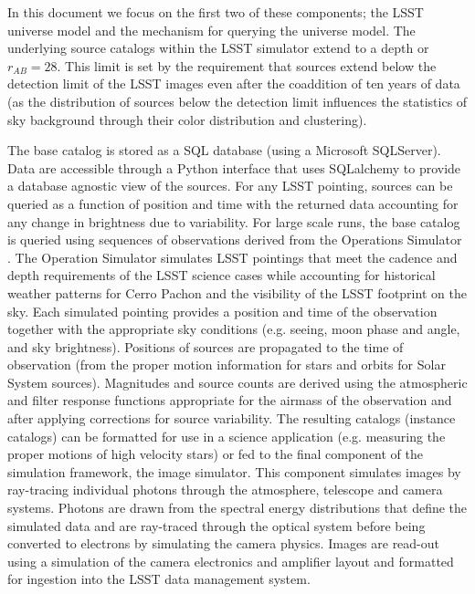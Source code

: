 \documentclass[]{article}
\begin{document}
In this document we focus on the first two of these components; the LSST
universe model and the mechanism for querying the universe model.  
The underlying source catalogs within the LSST
simulator extend to a depth or $r_{AB}=28$. This limit is set by the
requirement that sources extend below the detection limit of the LSST
images even after the coaddition of ten years of data (as the
distribution of sources below the detection limit influences the
statistics of sky background through their color distribution and
clustering).

The base catalog is stored as a SQL database (using a Microsoft
SQLServer). Data are accessible through a Python interface that uses
SQLalchemy to provide a database agnostic view of the sources. For any
LSST pointing, sources can be queried as a function of position and
time with the returned data accounting for any change in brightness
due to variability. For large scale runs, the base catalog is queried
using sequences of observations derived from the Operations Simulator
\cite{cook09}. The Operation Simulator simulates LSST pointings that
meet the cadence and depth requirements of the LSST science cases
while accounting for historical weather patterns for Cerro Pachon and
the visibility of the LSST footprint on the sky. Each simulated
pointing provides a position and time of the observation together with
the appropriate sky conditions (e.g. seeing, moon phase and angle, and
sky brightness). Positions of sources are propagated to the time of
observation (from the proper motion information for stars and orbits
for Solar System sources). Magnitudes and source counts are derived
using the atmospheric and filter response functions appropriate for
the airmass of the observation and after applying corrections for
source variability. The resulting catalogs (instance catalogs) can be
formatted for use in a science application (e.g. measuring the proper
motions of high velocity stars) or fed to the final component of the
simulation framework, the image simulator. This component simulates
images by ray-tracing individual photons through the atmosphere,
telescope and camera systems. Photons are drawn from the spectral
energy distributions that define the simulated data and are ray-traced
through the optical system before being converted to electrons by
simulating the camera physics. Images are read-out using a simulation
of the camera electronics and amplifier layout and formatted for
ingestion into the LSST data management system.
\end{document}
